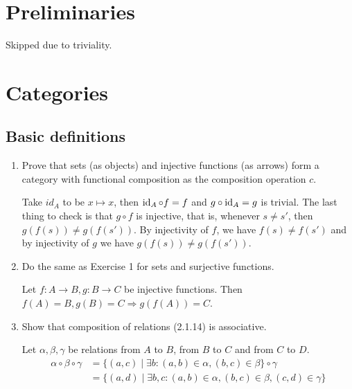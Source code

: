 



\section{Preliminaries}

Skipped due to triviality.

\section{Categories}

\subsection{Basic definitions}

\begin{enumerate}
    \item Prove that sets (as objects) and injective functions (as arrows) form a category with functional composition as the composition operation \(c\).
          \begin{solution}
              Take \(id_A\) to be \(x \mapsto x\), then \(\operatorname{id}_A \circ f = f\) and \(g \circ \operatorname{id}_A = g\) is trivial. The last thing to check is that \(g \circ f\) is injective, that is, whenever \(s \neq s'\), then \(g(f(s)) \neq g(f(s'))\). By injectivity of \(f\), we have \(f(s) \neq f(s')\) and by injectivity of \(g\) we have \(g(f(s)) \neq g(f(s'))\).
          \end{solution}
    \item Do the same as Exercise 1 for sets and surjective functions.
          \begin{solution}
              Let \(f : A \to B, g : B \to C\) be injective functions. Then \(f(A) = B, g(B) = C \Rightarrow g(f(A)) = C\).
          \end{solution}
    \item Show that composition of relations (2.1.14) is associative.
          \begin{solution}
              Let \(\alpha, \beta, \gamma\) be relations from \(A\) to \(B\), from \(B\) to \(C\) and from \(C\) to \(D\).
              \begin{align*}
                  \alpha \circ \beta \circ \gamma
                   & = \{(a, c) \mid \exists b : (a, b) \in \alpha, (b, c) \in \beta\} \circ \gamma          \\
                   & = \{(a, d) \mid \exists b, c : (a, b) \in \alpha, (b, c) \in \beta, (c, d) \in \gamma\} \\

\end{align*}
\end{solution}
\end{enumerate}

